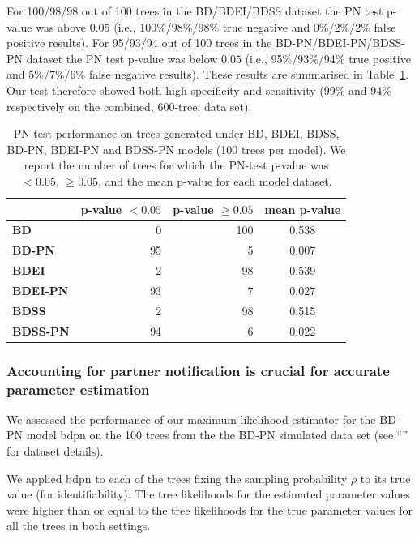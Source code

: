 \documentclass[10pt,letterpaper]{article}
\begin{document}
For 100/98/98 out of 100 trees in the BD/BDEI/BDSS dataset the PN test p-value was above $0.05$ (i.e., 100\%/98\%/98\% true negative and 0\%/2\%/2\% false positive results). For 95/93/94 out of 100 trees in the BD-PN/BDEI-PN/BDSS-PN dataset the PN test p-value was below $0.05$ (i.e., 95\%/93\%/94\% true positive and 5\%/7\%/6\% false negative results). These results are summarised in Table~\ref{tbl:pntest}. Our test therefore showed both high specificity and sensitivity (99\% and 94\% respectively on the combined, 600-tree, data set).

\begin{table}[!h]\centering
\small
\caption{PN test performance on trees generated under BD, BDEI, BDSS, BD-PN, BDEI-PN and BDSS-PN models (100 trees per model). We report the number of trees for which the PN-test p-value was $<0.05$, $\geq 0.05$, and the mean p-value for each model dataset.}
\begin{tabular}{l|r|r|c}
 & \textbf{p-value $<0.05$} & \textbf{p-value $\geq0.05$} & \textbf{mean p-value} \\
  \midrule
\textbf{BD}& 0 & 100 & 0.538 \\
\textbf{BD-PN}& 95 & 5 & 0.007 \\
  \midrule
\textbf{BDEI}& 2 & 98 & 0.539 \\
\textbf{BDEI-PN}& 93 & 7 & 0.027 \\
  \midrule
\textbf{BDSS}& 2 & 98 & 0.515 \\
\textbf{BDSS-PN}& 94 & 6 & 0.022 \\
\end{tabular}
\label{tbl:pntest}
\end{table}

\subsubsection*{Accounting for partner notification is crucial for accurate parameter estimation}

We assessed the performance of our maximum-likelihood estimator for the BD-PN model bdpn on the 100 trees from the the BD-PN simulated data set (see ``'' for dataset details).

We applied bdpn to each of the trees fixing the sampling probability $\rho$ to its true value (for identifiability). %
The tree likelihoods for the estimated parameter values were higher than or equal to the tree likelihoods for the true parameter values for all the trees in both settings.
\end{document}

